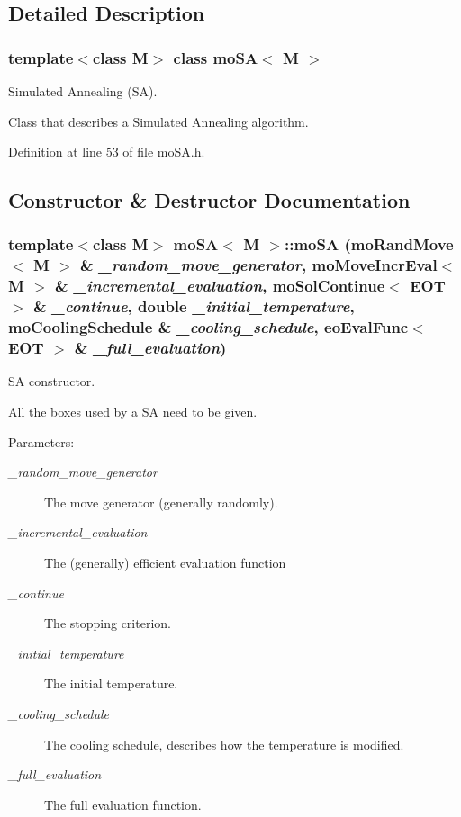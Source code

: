 \subsection{Detailed Description}
\subsubsection*{template$<$class M$>$ class mo\-SA$<$ M $>$}

Simulated Annealing (SA). 

Class that describes a Simulated Annealing algorithm. 



Definition at line 53 of file mo\-SA.h.

\subsection{Constructor \& Destructor Documentation}
\subsubsection{\setlength{\rightskip}{0pt plus 5cm}template$<$class M$>$ {\bf mo\-SA}$<$ M $>$::{\bf mo\-SA} ({\bf mo\-Rand\-Move}$<$ M $>$ \& {\em \_\-random\_\-move\_\-generator}, {\bf mo\-Move\-Incr\-Eval}$<$ M $>$ \& {\em \_\-incremental\_\-evaluation}, {\bf mo\-Sol\-Continue}$<$ {\bf EOT} $>$ \& {\em \_\-continue}, double {\em \_\-initial\_\-temperature}, {\bf mo\-Cooling\-Schedule} \& {\em \_\-cooling\_\-schedule}, {\bf eo\-Eval\-Func}$<$ {\bf EOT} $>$ \& {\em \_\-full\_\-evaluation})\hspace{0.3cm}{\tt  [inline]}}\label{classmo_s_a_a0}


SA constructor. 

All the boxes used by a SA need to be given.

\begin{Desc}
\item[Parameters:]
\begin{description}
\item[{\em \_\-random\_\-move\_\-generator}]The move generator (generally randomly). \item[{\em \_\-incremental\_\-evaluation}]The (generally) efficient evaluation function \item[{\em \_\-continue}]The stopping criterion. \item[{\em \_\-initial\_\-temperature}]The initial temperature. \item[{\em \_\-cooling\_\-schedule}]The cooling schedule, describes how the temperature is modified. \item[{\em \_\-full\_\-evaluation}]The full evaluation function. \end{description}
\end{Desc}


